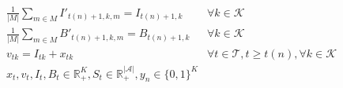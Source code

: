 \documentclass[10pt]{article}
\newcommand{\ti}{t} %
\newcommand{\TI}{\mathcal{T}}
\newcommand{\ka}{k} %
\newcommand{\KA}{\mathcal{K}}
\newcommand{\Ka}{K}
\newcommand{\jey}{j} %
\newcommand{\Graf}{\mathcal{A}} %
\newcommand{\Bi}{B} %
\newcommand{\Csub}{\mathcal{K}^+_k}
\newcommand{\Psub}{\mathcal{K}^-_k}
\begin{document}
\begin{subequations}
\begin{flalign}
& \frac{1}{|M|} \sum_{m \in M} I'_{\ti(n)+1,k,m} = I_{\ti(n)+1, \ka} &\forall \ka \in \KA & \label{eq:Average_Inventory_o} \\
& \frac{1}{|M|} \sum_{m \in M} B'_{\ti(n)+1,k,m} = B_{\ti(n)+1, \ka} &\forall \ka \in \KA & \label{eq:Average_Backlog_o}\\
& v_{\ti \ka} = I_{\ti \ka} + x_{\ti \ka}  \quad &\forall \ti  \in \TI, t \geq \ti(n),\forall \ka \in \KA \\
&{x}_{ \ti },  {v}_{ \ti },  {I}_{ \ti} , {\Bi}_{ \ti } \in \mathbb{R}_{+}^{\Ka} , {S}_{\ti} \in \mathbb{R}_{+}^{|\Graf|} ,{y}_{ n } \in \{0,1\}^{\Ka} & \label{eq:Sub_FD_bound3_o}
\end{flalign}

  \end{subequations}
  
  
  
\end{document}
